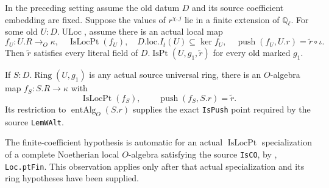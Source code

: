 \begin{proposition}
\label{AC-K29-point}
In the preceding setting assume the old datum $D$ and its
source coefficient embedding are fixed.  Suppose the values of
$r^{\chi,j}$ lie in a finite extension of $\mathbb Q_\ell$.
For some old $U:D.\operatorname{ULoc}$, assume there is an actual
local map
\[
 f_U:U.R\longrightarrow_O\kappa,
 \quad\operatorname{IsLocPt}(f_U),\quad
 D.\mathrm{loc}.I_t(U)\subseteq\ker f_U,
 \quad\operatorname{push}(f_U,U.r)
                   =\widetilde r\circ\iota.                 \tag{GP.11}
\]
Then $\widetilde r$ satisfies every literal field of
$D.\operatorname{IsPt}(U,g_1,\widetilde r)$ for every old
marked $g_1$.

If $S:D.\operatorname{Ring}(U,g_1)$ is any actual source
universal ring, there is an $O$-algebra map
$f_S:S.R\to\kappa$ with
\[
 \operatorname{IsLocPt}(f_S),\qquad
 \operatorname{push}(f_S,S.r)=\widetilde r.                  \tag{GP.12}
\]
Its restriction to $\operatorname{entAlg}_O(S.r)$ supplies
the exact \texttt{IsPush} point required by the source
\texttt{LemWAlt}.

The finite-coefficient hypothesis is automatic for an actual
$\operatorname{IsLocPt}$ specialization of a complete Noetherian
local $O$-algebra satisfying the source \texttt{IsCO}, by
, \texttt{Loc.ptFin}.
This observation applies only after that actual specialization
and its ring hypotheses have been supplied.
\end{proposition}
